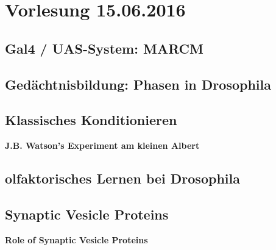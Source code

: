 \section{Vorlesung 15.06.2016}

\subsection{Gal4 / UAS-System: MARCM}

\subsection{Gedächtnisbildung: Phasen in Drosophila}

\subsection{Klassisches Konditionieren}

\textbf{J.B. Watson's Experiment am kleinen Albert}

\subsection{olfaktorisches Lernen bei Drosophila}

\subsection{Synaptic Vesicle Proteins}

\textbf{Role of Synaptic Vesicle Proteins}